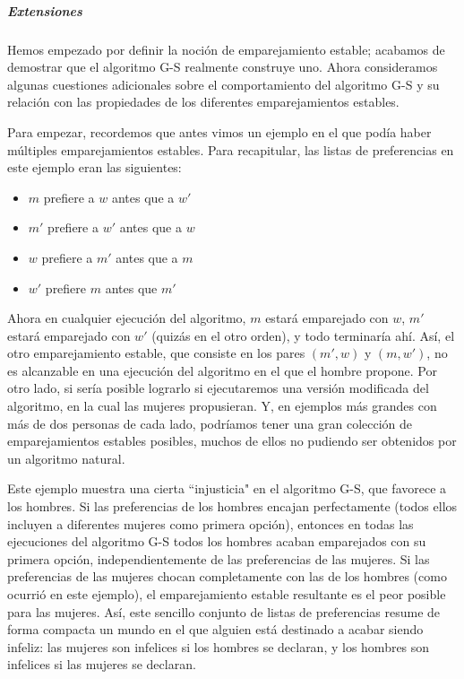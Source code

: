 \documentclass[a4paper, 12pt]{book}
\begin{document}
\subparagraph{Extensiones}

Hemos empezado por definir la noción de emparejamiento estable; acabamos de demostrar que el algoritmo G-S realmente construye uno. Ahora consideramos algunas cuestiones adicionales sobre el comportamiento del algoritmo G-S y su relación con las propiedades de los diferentes emparejamientos estables.

Para empezar, recordemos que antes vimos un ejemplo en el que podía haber múltiples emparejamientos estables. Para recapitular, las listas de preferencias en este ejemplo eran las siguientes:

\begin{itemize}
  \item $m$ prefiere a $w$ antes que a $w'$
  \item $m'$ prefiere a $w'$ antes que a $w$
  \item $w$ prefiere a $m'$ antes que a $m$
  \item $w'$ prefiere $m$ antes que $m'$
\end{itemize}

Ahora en cualquier ejecución del algoritmo, $m$ estará emparejado con $w$, $m'$ estará emparejado con $w'$ (quizás en el otro orden), y todo terminaría ahí. Así, el otro emparejamiento estable, que consiste en los pares $(m',w)$ y $(m,w')$, no es alcanzable en una ejecución del algoritmo en el que el hombre propone. Por otro lado, si sería posible lograrlo si ejecutaremos una versión modificada del algoritmo, en la cual las mujeres propusieran. Y, en ejemplos más grandes con más de dos personas de cada lado, podríamos tener una gran colección de emparejamientos estables posibles, muchos de ellos no pudiendo ser obtenidos por un algoritmo natural.

Este ejemplo muestra una cierta ``injusticia" en el algoritmo G-S, que favorece a los hombres. Si las preferencias de los hombres encajan perfectamente (todos ellos incluyen a diferentes mujeres como primera opción), entonces en todas las ejecuciones del algoritmo G-S todos los hombres acaban emparejados
con su primera opción, independientemente de las preferencias de las mujeres. Si las preferencias de las mujeres chocan completamente con las de los hombres (como ocurrió en este ejemplo), el emparejamiento estable resultante es el peor posible para las mujeres. Así, este sencillo conjunto de listas de preferencias resume de forma compacta un mundo en el que alguien está destinado a acabar siendo infeliz: las mujeres son infelices si los hombres se declaran, y los hombres son infelices si las mujeres se declaran.
\end{document}
